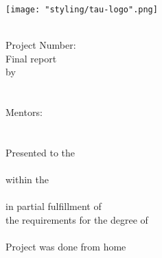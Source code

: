 \centerline{\texttt{[image: "styling/tau-logo".png]}}
\vspace*{\fill}
\begin{center}
\doublespaced
{\Large\MakeUppercase{\projecttitle}}\\
\vspace{10pt}
Project Number: \projectnum\\
Final report\\
\vspace{10pt}
by\\
\projectauthorone\\
\projectauthortwo\\
Mentors:\\
\projectmentorone\\
\projectmentortwo\\
\vspace{20pt}
Presented to the\\
\department\\
within the \institution\\
\school\\
in partial fulfillment of\\
the requirements for the degree of\\
\degree\\
\vspace{30pt}
Project was done from home
\end{center}
\vspace*{\fill}
\clearpage
